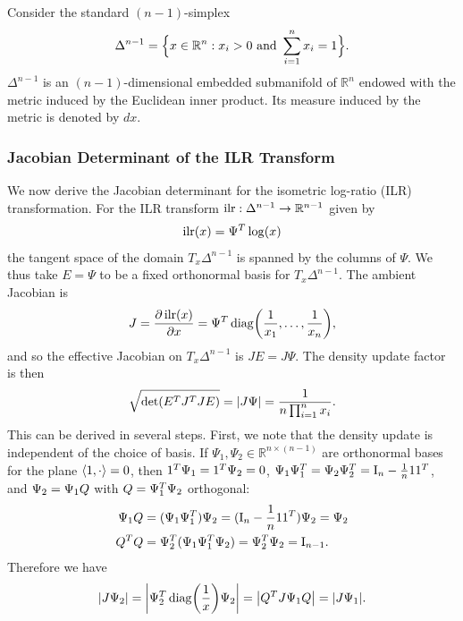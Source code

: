 Consider the standard $(n-1)$-simplex
\begin{align}
    \Delta^{n-1} = \Bigl\{ x \in \mathbb{R}^n : x_i > 0 \text{ and } \sum_{i=1}^{n} x_i = 1 \Bigr\}.
\end{align}
$\Delta^{n-1}$ is an $(n-1)$-dimensional embedded submanifold of $\mathbb{R}^n$ endowed with the metric induced by the Euclidean inner product.
Its measure induced by the metric is denoted by $dx$.

\subsubsection{Jacobian Determinant of the \gls*{ILR} Transform}\label{sec:supp:ilr_jacobian_det}

We now derive the Jacobian determinant for the isometric log-ratio (\gls*{ILR}) transformation.
For the \gls*{ILR} transform $\operatorname{ilr} : \Delta^{n-1} \to \mathbb{R}^{n-1}$ given by
\begin{align}
    \ILR{x}=\Psi^T\log(x)
\end{align}
the tangent space of the domain $T_x \Delta^{n-1}$ is spanned by the columns of $\Psi$.
We thus take $E=\Psi$ to be a fixed orthonormal basis for $T_x\Delta^{n-1}$.
The ambient Jacobian is
\begin{align}
    J = \frac{\partial \ILR{x}}{\partial x} = \Psi^T \Diag{\frac{1}{x_1},\ldots,\frac{1}{x_{n}}},
\end{align}
and so the effective Jacobian on $T_x\Delta^{n-1}$ is $JE = J\Psi$.
The density update factor is then
\begin{align}
    \sqrt{\Det{E^T J^T J E}} = \AbsDet{J\Psi} = \frac{1}{n\prod_{i=1}^n x_i}.
\end{align}
This can be derived in several steps.
First, we note that the density update is independent of the choice of basis.
If $\Psi_1, \Psi_2 \in \mathbb{R}^{n \times (n-1)}$ are orthonormal bases for the plane $\langle \mathrm{1}, \cdot \rangle = 0$, then
$\mathrm{1}^T \Psi_1 = \mathrm{1}^T \Psi_2 = \mathrm{0}$, $\Psi_1 \Psi_1^T = \Psi_2 \Psi_2^T = \mathrm{I}_{n} - \frac{1}{n} \mathrm{1} \mathrm{1}^T$, and $\Psi_2 = \Psi_1 Q$ with $Q = \Psi_1^T \Psi_2$ orthogonal:
\begin{align*}
    \Psi_1 Q   & = (\Psi_1 \Psi_1^T) \Psi_2 = (\mathrm{I}_{n} - \frac{1}{n} \mathrm{1} \mathrm{1}^T) \Psi_2 = \Psi_2 \\
    Q^T Q & = \Psi_2^T (\Psi_1 \Psi_1^T \Psi_2) = \Psi_2^T \Psi_2 = \mathrm{I}_{n-1}.
\end{align*}
Therefore we have
\begin{align*}
    \AbsDet{J\Psi_2} = \AbsDet{\Psi_2^T \Diag{\frac{1}{x}} \Psi_2} = \AbsDet{\vv{Q}^T J\Psi_1 \vv{Q}} = \AbsDet{J\Psi_1}.
\end{align*}
